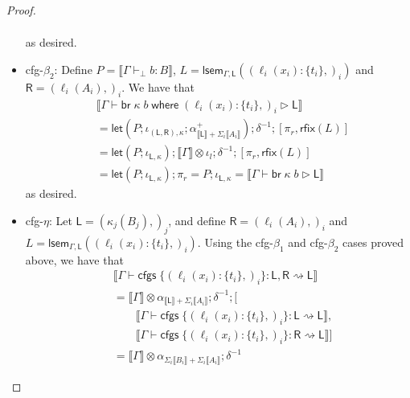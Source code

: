 \documentclass[acmsmall,screen,review]{acmart}
\newcommand{\ms}[1]{\ensuremath{\mathsf{#1}}}
\newcommand{\lto}{:}
\newcommand{\brb}[2]{\ms{br}\;#1\;#2}
\newcommand{\where}[2]{#1\;\ms{where}\;#2}
\newcommand{\wbranch}[3]{#1(#2) \lto \{#3\}}
\newcommand{\cfgsubst}[1]{\ms{cfgs}\;\{#1\}}
\newcommand{\hasty}[4]{#1 \vdash_{#2} #3: {#4}}
\newcommand{\haslb}[3]{#1 \vdash #2 \rhd #3}
\newcommand{\lbsubst}[4]{#1 \vdash #2: #3 \rightsquigarrow #4}
\newcommand{\brle}[1]{{\textsf{#1}}}
\newcommand{\dnt}[1]{\llbracket{#1}\rrbracket}
\newcommand{\loopmor}[3]{\ms{lsem}_{#1, #3}(#2)}
\newcommand{\lmor}[1]{\ms{let}(#1)}
\newcommand{\rfix}[1]{\ms{rfix}(#1)}
\begin{document}
\begin{proof}
\begin{itemize}[leftmargin=*]
\begin{equation}
\begin{aligned}
{        }
      \end{aligned}
    \end{equation}
    as desired.
    \item \brle{cfg-$\beta_2$}: 
    Define $P = \dnt{\hasty{\Gamma}{\bot}{b}{B}}$,
            $L = \loopmor{\Gamma}{(\wbranch{\ell_i}{x_i}{t_i},)_i}{\ms{L}}$ and %
            $\ms{R} = (\ell_i(A_i),)_i$. %
    We have that
    \begin{equation}
      \begin{aligned}
        & \dnt{\haslb{\Gamma}{\where{\brb{\kappa}{b}}{(\wbranch{\ell_i}{x_i}{t_i},)_i}}{\ms{L}}} \\
        & = \lmor{P 
            ; \iota_{(\ms{L}, \ms{R}), \kappa} 
            ; \alpha^+_{\dnt{\ms{L}} + \Sigma_i \dnt{A_i}}
          } ; \delta^{-1} ; [\pi_r, \rfix{L}] \\
        & = \lmor{P ; \iota_{\ms{L}, \kappa}} 
          ; \dnt{\Gamma} \otimes \iota_l ; \delta^{-1} ; [\pi_r, \rfix{L}] \\
        & = \lmor{P ; \iota_{\ms{L}, \kappa}} ; \pi_r
          = P ; \iota_{\ms{L}, \kappa}
          = \dnt{\haslb{\Gamma}{\brb{\kappa}{b}}{\ms{L}}}
      \end{aligned}
    \end{equation}
    as desired.
    \item \brle{cfg-$\eta$}: 
    Let $\ms{L} = (\kappa_j(B_j),)_j$, and define %
      $\ms{R} = (\ell_i(A_i),)_i$ and %
      $L = \loopmor{\Gamma}{(\wbranch{\ell_i}{x_i}{t_i},)_i}{\ms{L}}$. %
    Using the \brle{cfg-$\beta_1$} and \brle{cfg-$\beta_2$} cases proved above, we have that
    \begin{equation}
      \begin{aligned}
        & \dnt{
            \lbsubst{\Gamma}
              {\cfgsubst{(\wbranch{\ell_i}{x_i}{t_i},)_i}}{\ms{L}, \ms{R}}{\ms{L}}
          } \\
        & = \dnt{\Gamma} \otimes \alpha_{\dnt{\ms{L}} + \Sigma_i\dnt{A_i}} ; \delta^{-1}
          ; [ \\ & \qquad
            \dnt{
              \lbsubst{\Gamma}
                {\cfgsubst{(\wbranch{\ell_i}{x_i}{t_i},)_i}}{\ms{L}}{\ms{L}}
            }, \\ & \qquad
            \dnt{
              \lbsubst{\Gamma}
                {\cfgsubst{(\wbranch{\ell_i}{x_i}{t_i},)_i}}{\ms{R}}{\ms{L}}
            }
          ] \\
        & = \dnt{\Gamma} \otimes \alpha_{\Sigma_i\dnt{B_i} + \Sigma_i\dnt{A_i}}; \delta^{-1}

\end{aligned}
\end{equation}
\end{itemize}
\end{proof}
\end{document}
